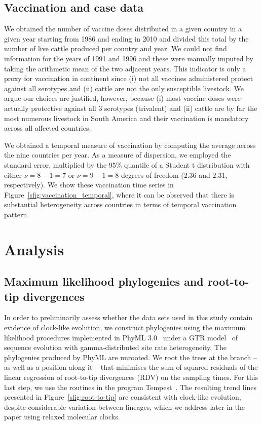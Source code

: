\documentclass[a4paper,10pt]{article}
\begin{document}
\subsection*{Vaccination and case data}

We obtained the number of vaccine doses distributed in a given country in a given year starting from 1986 and ending in 2010 and divided this total by the number of live cattle produced per country and year.
We could not find information for the years of 1991 and 1996 and these were manually imputed by taking the arithmetic mean of the two adjacent years.
This indicator is only a proxy for vaccination in continent since (i) not all vaccines administered protect against all serotypes and (ii) cattle are not the only susceptible livestock.
We argue our choices are justified, however, because (i) most vaccine doses were actually protective against all 3 serotypes (trivalent) and (ii) cattle are by far the most numerous livestock in South America and their vaccination is mandatory across all affected countries.

We obtained a temporal measure of vaccination by computing the average across the nine countries per year.
As a measure of dispersion, we employed the standard error, multiplied by the 95\% quantile of a Student t distribution with either $\nu = 8 -1 = 7$ or $\nu = 9-1 = 8$ degrees of freedom ($2.36$ and $2.31$, respectively).
We show these vaccination time series in Figure~\ref{sfig:vaccination_temporal}, where it can be observed that there is substantial heterogeneity across countries in terms of temporal vaccination pattern.

\section*{Analysis}

\subsection*{Maximum likelihood phylogenies and root-to-tip divergences}

In order to preliminarily assess whether the data sets used in this study contain evidence of clock-like evolution, we construct phylogenies using the maximum likelihood procedures implemented in PhyML 3.0~\cite{M-Guindon2003} under a GTR model~\cite{M-Tavare1986} of sequence evolution with gamma-distributed site rate heterogeneity.
The phylogenies produced by PhyML are unrooted.
We root the trees at the branch -- as well as a position along it -- that minimises the sum of squared residuals of the linear regression of root-to-tip divergences (RDV) on the sampling times.
For this last step, we use the routines in the program Tempest~\citep{M-Rambaut2016}.
The resulting trend lines presented in Figure~\ref{sfig:root-to-tip} are consistent with clock-like evolution, despite considerable variation between lineages, which we address later in the paper using relaxed molecular clocks.
\end{document}
